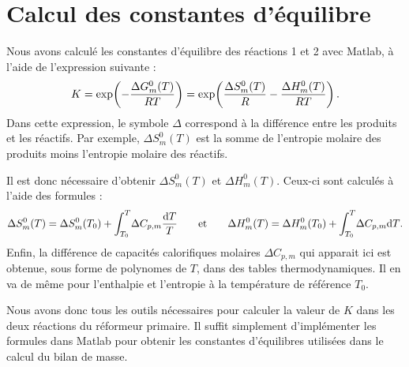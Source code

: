 \section{Calcul des constantes d'équilibre}\label{appendix:const_eq}

Nous avons calculé les constantes d'équilibre des réactions 1 et 2 avec Matlab, à l'aide de l'expression suivante :
\[
    K = \mathrm{exp}\!\left( -\frac{\Delta G^0_m(T)}{RT} \right)
      = \mathrm{exp}\!\left( \frac{\Delta S^0_m(T)}{R} - \frac{\Delta H^0_m(T)}{RT} \right)
    \text.
\]
Dans cette expression, le symbole $\Delta$ correspond à la différence entre les produits et les réactifs. Par exemple, $\Delta S^0_m(T)$ est la somme de l'entropie molaire des produits moins l'entropie molaire des réactifs.

Il est donc nécessaire d'obtenir $\Delta S^0_m(T)$ et $\Delta H^0_m(T)$. Ceux-ci sont calculés à l'aide des formules :
\[
    \Delta S^0_m(T) = \Delta S^0_m(T_0) + \int_{T_0}^T\! \Delta C_{p,m} \frac{\mathrm{d}T}{T}
    \qquad\text{et}\qquad
    \Delta H^0_m(T) = \Delta H^0_m(T_0) + \int_{T_0}^T\! \Delta C_{p,m} \mathrm{d}T
    \text.
\]
Enfin, la différence de capacités calorifiques molaires $\Delta C_{p,m}$ qui apparait ici est obtenue, sous forme de polynomes de $T$, dans des tables thermodynamiques. Il en va de même pour l'enthalpie et l'entropie à la température de référence $T_0$.

Nous avons donc tous les outils nécessaires pour calculer la valeur de $K$ dans les deux réactions du réformeur primaire. Il suffit simplement d'implémenter les formules dans Matlab pour obtenir les constantes d'équilibres utilisées dans le calcul du bilan de masse.
